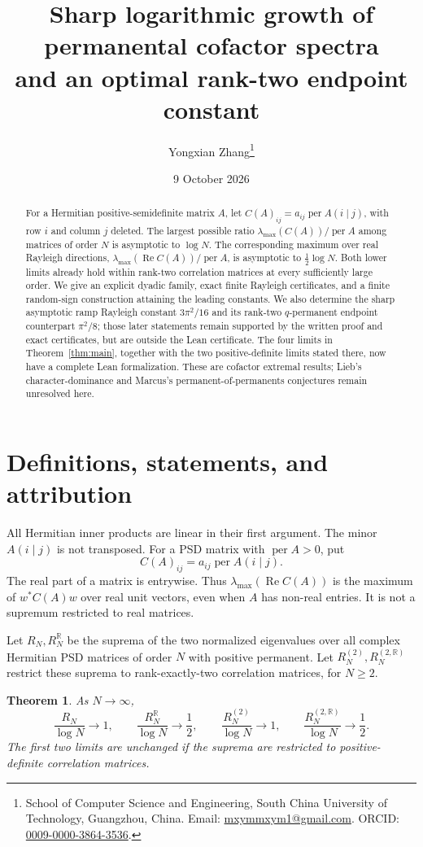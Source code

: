 \documentclass[11pt]{article}
\title{Sharp logarithmic growth of permanental cofactor spectra\\and an optimal rank-two endpoint constant}
\author{Yongxian Zhang\thanks{School of Computer Science and Engineering,
South China University of Technology, Guangzhou, China.
Email: \href{mailto:mxymmxym1@gmail.com}{mxymmxym1@gmail.com}.
ORCID: \href{https://orcid.org/0009-0000-3864-3536}{0009-0000-3864-3536}.}}
\date{9 October 2026}
\newtheorem{theorem}{Theorem}
\DeclareMathOperator{\per}{per}
\DeclareMathOperator{\Ree}{Re}
\begin{document}
\maketitle
\begin{abstract}
For a Hermitian positive-semidefinite matrix $A$, let
$C(A)_{ij}=a_{ij}\per A(i\mid j)$, with row $i$ and column $j$ deleted.
The largest possible ratio $\lambda_{\max}(C(A))/\per A$ among matrices of
order $N$ is asymptotic to $\log N$. The corresponding maximum over real
Rayleigh directions, $\lambda_{\max}(\Ree C(A))/\per A$, is asymptotic to
$\tfrac12\log N$. Both lower limits already hold within rank-two correlation
matrices at every sufficiently large order. We give an explicit dyadic family,
exact finite Rayleigh certificates, and a finite random-sign construction
attaining the leading constants. We also determine the sharp asymptotic ramp
Rayleigh constant $3\pi^2/16$ and its rank-two $q$-permanent endpoint counterpart
$\pi^2/8$; those later statements remain supported by the written proof and
exact certificates, but are outside the Lean certificate. The four limits in
Theorem~\ref{thm:main}, together with the two positive-definite limits stated
there, now have a complete Lean formalization. These are cofactor extremal
results; Lieb's character-dominance and Marcus's permanent-of-permanents
conjectures remain unresolved here.
\end{abstract}

\section{Definitions, statements, and attribution}
All Hermitian inner products are linear in their first argument. The minor
$A(i\mid j)$ is not transposed. For a PSD matrix with $\per A>0$, put
\[
 C(A)_{ij}=a_{ij}\per A(i\mid j).
\]
The real part of a matrix is entrywise. Thus $\lambda_{\max}(\Ree C(A))$ is the
maximum of $w^*C(A)w$ over real unit vectors, even when $A$ has non-real entries.
It is not a supremum restricted to real matrices.

Let $R_N,R_N^{\mathbb R}$ be the suprema of the two normalized eigenvalues over
all complex Hermitian PSD matrices of order $N$ with positive permanent.
Let $R_N^{(2)},R_N^{(2,\mathbb R)}$ restrict these suprema to rank-exactly-two
correlation matrices, for $N\ge2$.
\begin{theorem}\label{thm:main}
As $N\to\infty$,
\[
 \frac{R_N}{\log N}\longrightarrow1,\qquad
 \frac{R_N^{\mathbb R}}{\log N}\longrightarrow\frac12,\qquad
 \frac{R_N^{(2)}}{\log N}\longrightarrow1,\qquad
 \frac{R_N^{(2,\mathbb R)}}{\log N}\longrightarrow\frac12.
\]
The first two limits are unchanged if the suprema are restricted to
positive-definite correlation matrices.
\end{theorem}
\end{document}
